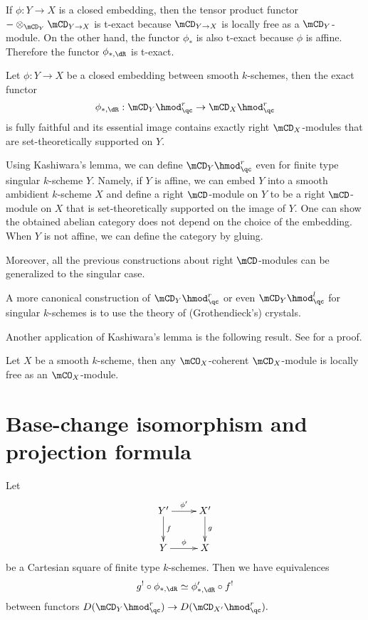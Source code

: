 	If $\phi:Y\to X$ is a closed embedding, then the tensor product functor $-\ot_{\mCD_Y} \mCD_{Y\to X}$ is t-exact because $\mCD_{Y\to X}$ is locally free as a $\mCD_Y$-module. On the other hand, the functor $\phi_*$ is also t-exact because $\phi$ is affine. Therefore the functor $\phi_{*,\dR} $ is t-exact. 

	\begin{thm}
		Let $\phi:Y \to X$ be a closed embedding between smooth $k$-schemes, then the exact functor
		\[
			\phi_{*,\dR}:  \mCD_Y\hmod_\qc^r  \to  \mCD_X\hmod_\qc^r
		\]
		is fully faithful and its essential image contains exactly right $\mCD_X$-modules that are set-theoretically supported on $Y$.
	\end{thm}

	

	\begin{rem}
		Using Kashiwara's lemma, we can define $\mCD_Y\hmod_\qc^r$ even for finite type singular $k$-scheme $Y$. Namely, if $Y$ is affine, we can embed $Y$ into a smooth ambidient $k$-scheme $X$ and define a right $\mCD$-module on $Y$ to be a right $\mCD$-module on $X$ that is set-theoretically supported on the image of $Y$. One can show the obtained abelian category does not depend on the choice of the embedding. When $Y$ is not affine, we can define the category by gluing.

		Moreover, all the previous constructions about right $\mCD$-modules can be generalized to the singular case.

		A more canonical construction of $\mCD_Y\hmod_\qc^r$ or even $\mCD_Y\hmod_\qc^l$ for singular $k$-schemes is to use the theory of (Grothendieck's) crystals.
	\end{rem}

	Another application of Kashiwara's lemma is the following result. See \cite[Sect. 5.12]{G} for a proof.

	\begin{cor}
		Let $X$ be a smooth $k$-scheme, then any $\mCO_X$-coherent $\mCD_X$-module is locally free as an $\mCO_X$-module.
	\end{cor}

\section{Base-change isomorphism and projection formula}
	\begin{facts}
		Let
		\[
			\xymatrix{
				Y' \ar[r]^-{\phi'} \ar[d]^-f & X' \ar[d]^-g \\
				Y \ar[r]^-\phi & X
			}
		\]
		be a Cartesian square of finite type $k$-schemes. Then we have equivalences
		\[
			g^!\circ \phi_{*,\dR} \simeq \phi'_{*,\dR}\circ f^!
		\]
		between functors $D( \mCD_Y\hmod_\qc^r ) \to D( \mCD_{X'}\hmod_\qc^r ). $
	\end{facts}

